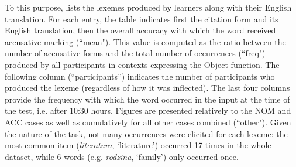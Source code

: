 To this purpose,  lists the lexemes produced by learners along with their English translation. For each entry, the table indicates first the citation form and its English translation, then the overall accuracy with which the word received accusative marking (“mean"). This value is computed as the ratio between the number of accusative forms and the total number of occurrences (“freq") produced by all participants in contexts expressing the Object function. The following column (“participants”) indicates the number of participants who produced the lexeme (regardless of how it was inflected). The last four columns provide the frequency with which the word occurred in the input at the time of the test, i.e. after 10:30 hours. Figures are presented relatively to the NOM and ACC cases as well as cumulatively for all other cases combined (“other"). Given the nature of the task, not many occurrences were elicited for each lexeme: the most common item (\textit{literatura}, ‘literature’) occurred 17 times in the whole dataset, while 6 words (e.g. \textit{rodzina}, ‘family’) only occurred once. 

